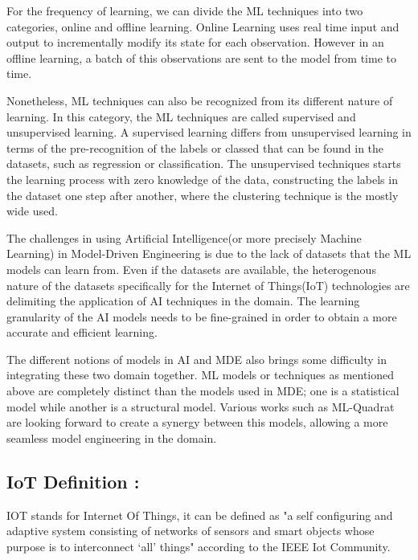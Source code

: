 For the frequency of learning, we can divide the ML techniques into two categories, online and offline learning. Online Learning uses real time input and output to incrementally modify its state for each observation. However in an offline learning, a batch of this observations are sent to the model from time to time.

Nonetheless, ML techniques can also be recognized from its different nature of learning. In this category, the ML techniques are called supervised and unsupervised learning. A supervised learning differs from unsupervised learning in terms of the pre-recognition of the labels or classed that can be found in the datasets, such as regression or classification. The unsupervised techniques starts the learning process with zero knowledge of the data, constructing the labels in the dataset one step after another, where the clustering technique is the mostly wide used. 

The challenges in using Artificial Intelligence(or more precisely Machine Learning) in Model-Driven Engineering is due to the lack of datasets that the ML models can learn from. Even if the datasets are available, the heterogenous nature of the datasets specifically for the Internet of Things(IoT) technologies are delimiting the application of AI techniques in the domain. The learning granularity of the AI models needs to be fine-grained in order to obtain a more accurate and efficient learning.

The different notions of models in AI and MDE also brings some difficulty in integrating these two domain together. ML models or techniques as mentioned above are completely distinct than the models used in MDE; one is a statistical model while another is a structural model. Various works such as ML-Quadrat are looking forward to create a synergy between this models, allowing a more seamless model engineering in the domain.

\subsection{IoT Definition : }
  IOT stands for Internet Of Things, it can be defined as "a self configuring and adaptive system consisting 
      of networks of sensors and smart objects whose purpose is to interconnect ‘all’ things" 
      according to the IEEE Iot Community\cite{buildingIot}.
     
